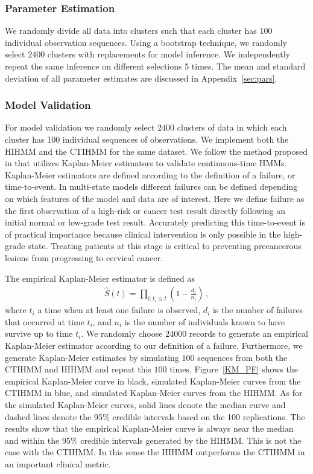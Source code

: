 \documentclass{article}
\begin{document}
\subsubsection{Parameter Estimation}
We randomly divide all data into clusters such that each cluster has 100 individual observation sequences. Using a bootstrap technique, we randomly select $2400$ clusters with replacements for model inference. We independently repeat the same inference on different selections 5 times. The mean and standard deviation of all parameter estimates are discussed in Appendix~\ref{sec:pars}.

\subsubsection{Model Validation}
For model validation we randomly select $2400$ clusters of data in which each cluster has 100 individual sequences of observations. We implement both the HIHMM and the CTIHMM for the same dataset. We follow the method proposed in \cite{titman_general_2008} that utilizes Kaplan-Meier estimators to validate continuous-time HMMs. Kaplan-Meier estimators are defined according to the definition of a failure, or time-to-event. In multi-state models different failures can be defined depending on which features of the model and data are of interest. Here we define failure as the first observation of a high-risk or cancer test result directly following an initial normal or low-grade test result.  Accurately predicting this time-to-event is of practical importance because clinical intervention is only possible in the high-grade state.  Treating patients at this stage is critical to preventing precancerous lesions from progressing to cervical cancer. 

The empirical Kaplan-Meier estimator is defined as 
\begin{eqnarray*}
	\hat{S}(t) = \prod_{i: t_i\leq t}\left(1 - \frac{d_i}{n_i}\right)\,,
\end{eqnarray*}
where $t_i$ a time when at least one failure is observed, $d_i$ is the number of failures that occurred at time $t_i$, and $n_i$ is the number of individuals known to have survive up to time $t_i$. We randomly choose $24000$ records to generate an empirical Kaplan-Meier estimator according to our definition of a failure. Furthermore, we generate Kaplan-Meier estimates by simulating $100$ sequences from both the CTIHMM and HIHMM and repeat this $100$ times. Figure~\ref{KM_PF} shows the empirical Kaplan-Meier curve in black, simulated Kaplan-Meier curves from the CTIHMM in blue, and simulated Kaplan-Meier curves from the HIHMM. As for the simulated Kaplan-Meier curves, solid lines denote the median curve and dashed lines denote the 95\% credible intervals based on the 100 replications. The results show that the empirical Kaplan-Meier curve is always near the median and within the 95\% credible intervals generated by the HIHMM. This is not the case with the CTIHMM. In this sense the HIHMM outperforms the CTIHMM in an important clinical metric.
\end{document}
